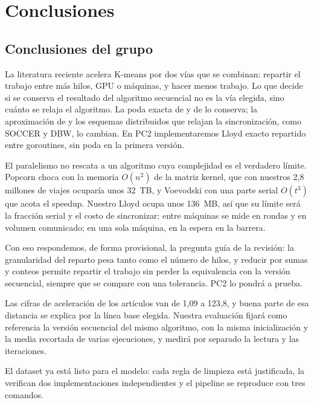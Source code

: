 \section{Conclusiones}

\subsection{Conclusiones del grupo}

La literatura reciente acelera K-means por dos vías que se combinan: repartir el trabajo entre más
hilos, GPU o máquinas, y hacer menos trabajo. Lo que decide si se conserva el resultado del algoritmo
secuencial no es la vía elegida, sino cuánto se relaja el algoritmo. La poda exacta de
\textcite{li2023} y de \textcite{kwedlo2021} lo conserva; la aproximación de
\textcite{voevodski2024} y los esquemas distribuidos que relajan la sincronización, como SOCCER y
DBW, lo cambian. En PC2 implementaremos Lloyd exacto repartido entre goroutines, sin poda en la
primera versión.

El paralelismo no rescata a un algoritmo cuya complejidad es el verdadero límite. Popcorn choca con
la memoria $O(n^2)$ de la matriz kernel, que con nuestros 2,8 millones de viajes ocuparía unos
32~TB, y Voevodski con una parte serial $O(t^3)$ que acota el speedup. Nuestro Lloyd ocupa unos
136~MB, así que su límite será la fracción serial y el costo de sincronizar: entre máquinas se mide
en rondas y en volumen comunicado; en una sola máquina, en la espera en la barrera.

Con eso respondemos, de forma provisional, la pregunta guía de la revisión: la granularidad del
reparto pesa tanto como el número de hilos, y reducir por sumas y conteos permite repartir el
trabajo sin perder la equivalencia con la versión secuencial, siempre que se compare con una
tolerancia. PC2 lo pondrá a prueba.

Las cifras de aceleración de los artículos van de 1,09 a 123,8, y buena parte de esa distancia se
explica por la línea base elegida. Nuestra evaluación fijará como referencia la versión secuencial
del mismo algoritmo, con la misma inicialización y la media recortada de varias ejecuciones, y medirá
por separado la lectura y las iteraciones.

El dataset ya está listo para el modelo: cada regla de limpieza está justificada, la verifican dos
implementaciones independientes y el pipeline se reproduce con tres comandos.


